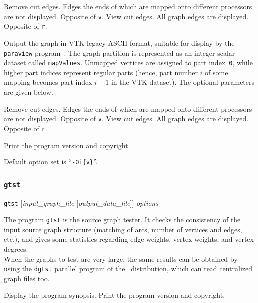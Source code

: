 \begin{itemize}
\begin{itemize}
\begin{itemize}
\begin{itemize}
\iteme[\texttt{r}]
Remove cut edges. Edges the ends of which are mapped onto different
processors are not displayed. Opposite of \texttt{v}.
\iteme[\texttt{v}]
View cut edges. All graph edges are displayed.
Opposite of \texttt{r}.
\end{itemize}
\iteme[\texttt{v}]
Output the graph in VTK legacy ASCII format, suitable for display by
the \texttt{paraview} program~\cite{paraview}. The graph partition is
represented as an integer scalar dataset called \texttt{mapValues}.
Unmapped vertices are assigned to part index~\texttt{0}, while higher
part indices represent regular parts (hence, part number $i$ of some
mapping becomes part index $i+1$ in the VTK dataset).
The optional parameters are given below.
\begin{itemize}
\iteme[\texttt{r}]
Remove cut edges. Edges the ends of which are mapped onto different
processors are not displayed. Opposite of \texttt{v}.
\iteme[\texttt{v}]
View cut edges. All graph edges are displayed.
Opposite of \texttt{r}.
\end{itemize}
\end{itemize}
\iteme[\texttt{-V}]
Print the program version and copyright.
\end{itemize}

Default option set is ``\texttt{-Oi\{v\}}''.
\end{itemize}

\subsubsection{\texttt{gtst}}

\begin{itemize}
\progsyn
\texttt{gtst} [{\it input\_graph\_file} [{\it output\_data\_file}]] {\it options}

\progdes
The program \texttt{gtst} is the source graph tester. It checks the
consistency of the input source graph structure (matching of arcs,
number of vertices and edges, etc\@.), and gives some statistics
regarding edge weights, vertex weights, and vertex degrees.
\\

When the graphs to test are very large, the same results can
be obtained by using the \texttt{dgtst} parallel program of the
\ptscotch\ distribution, which can read centralized graph
files too.

\progopt
\begin{itemize}
\iteme[\texttt{-h}]
Display the program synopsis.
\iteme[\texttt{-V}]
Print the program version and copyright.
\end{itemize}
\end{itemize}

